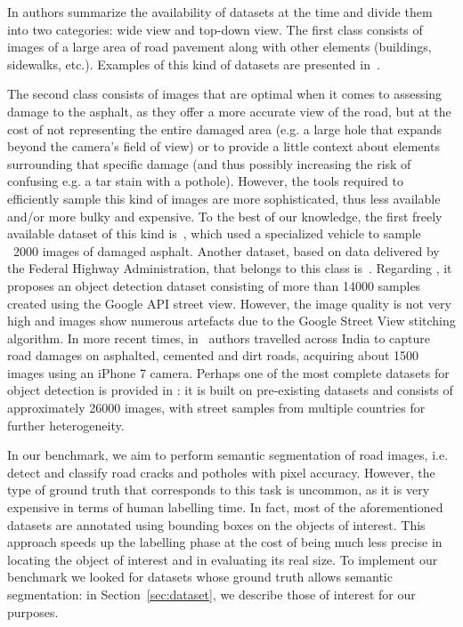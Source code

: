 \documentclass[twocolumn]{article}
\begin{document}
In \cite{Majidifard19} authors summarize the availability of datasets at the time and divide them into two categories: wide view and top-down view. The first class consists of images of a large area of road pavement along with other elements (buildings, sidewalks, etc.). Examples of this kind of datasets are presented in~\cite{Pothole-600_4,crack500_1,Maeda18}.

The second class consists of images that are optimal when it comes to assessing damage to the asphalt, as they offer a more accurate view of the road, but at the cost of not representing the entire damaged area (e.g. a large hole that expands beyond the camera's field of view) or to provide a little context about elements surrounding that specific damage (and thus possibly increasing the risk of confusing e.g. a tar stain with a pothole).
However, the tools required to efficiently sample this kind of images are more sophisticated, thus less available and/or more bulky and expensive. To the best of our knowledge, the first freely available dataset of this kind is~\cite{Eisenbach2017}, which used a specialized vehicle to sample ~2000 images of damaged asphalt. Another dataset, based on data delivered by the Federal Highway Administration, that belongs to this class is~\cite{GOPALAKRISHNAN2017}. Regarding \cite{Majidifard19}, it proposes an object detection dataset consisting of more than 14000 samples created using the Google API street view. However, the image quality is not very high and images show numerous artefacts due to the Google Street View stitching algorithm. In more recent times, in~\cite{Dharneeshkar20} authors travelled across India to capture road damages on asphalted, cemented and dirt roads, acquiring about 1500 images using an iPhone 7 camera. Perhaps one of the most complete datasets for object detection is provided in \cite{Arya20}: it is built on pre-existing datasets and consists of approximately 26000 images, with street samples from multiple countries for further heterogeneity.

In our benchmark, we aim to perform semantic segmentation of road images, i.e. detect and classify road cracks and potholes with pixel accuracy. However, the type of ground truth that corresponds to this task is uncommon, as it is very expensive in terms of human labelling time. In fact, most of the aforementioned datasets are annotated using bounding boxes on the objects of interest. This approach speeds up the labelling phase at the cost of being much less precise in locating the object of interest and in evaluating its real size.
To implement our benchmark we looked for datasets whose ground truth allows semantic segmentation: in Section~\ref{sec:dataset}, we describe those of interest for our purposes.
\end{document}
